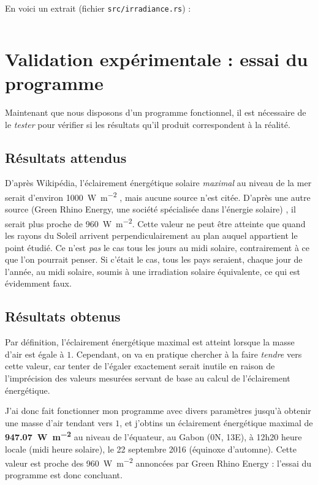 \documentclass[12pt]{article}
\begin{document}
En voici un extrait (fichier \texttt{src/irradiance.rs}) :

\inputminted[linenos]{rust}{rust-climate/src/irradiance.rs}



\clearpage
\section{Validation expérimentale : essai du programme}

Maintenant que nous disposons d'un programme fonctionnel, il est nécessaire de le \emph{tester} pour vérifier si les résultats qu'il produit correspondent à la réalité.

\subsection{Résultats attendus}

D'après Wikipédia, l'éclairement énergétique solaire \emph{maximal} au niveau de la mer serait d'environ \SI{1000}{\watt\per\square\meter} \cite{earth_irradiance_wiki}, mais aucune source n'est citée.
D'après une autre source (Green Rhino Energy, une société spécialisée dans l'énergie solaire) \cite{green_rhino_irradiance}, il serait plus proche de \SI{960}{\watt\per\square\meter}.
Cette valeur ne peut être atteinte que quand les rayons du Soleil arrivent perpendiculairement au plan auquel appartient le point étudié.
Ce n'est \emph{pas} le cas tous les jours au midi solaire, contrairement à ce que l'on pourrait penser.
Si c'était le cas, tous les pays seraient, chaque jour de l'année, au midi solaire, soumis à une irradiation solaire équivalente, ce qui est évidemment faux.


\subsection{Résultats obtenus}

Par définition, l'éclairement énergétique maximal est atteint lorsque la masse d'air est égale à $1$.
Cependant, on va en pratique chercher à la faire \emph{tendre} vers cette valeur, car tenter de l'égaler exactement serait inutile en raison de l'imprécision des valeurs mesurées servant de base au calcul de l'éclairement énergétique.

J'ai donc fait fonctionner mon programme avec divers paramètres jusqu'à obtenir une masse d'air tendant vers $1$, et j'obtins un éclairement énergétique maximal de \textbf{\SI{947.07}{\watt\per\square\meter}} au niveau de l'équateur, au Gabon (0\degree N, 13\degree E), à 12h20 heure locale (midi heure solaire), le 22 septembre 2016 (équinoxe d'automne).
Cette valeur est proche des \SI{960}{\watt\per\square\meter} annoncées par Green Rhino Energy : l'essai du programme est donc concluant.
\end{document}
